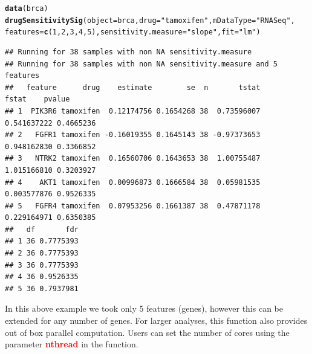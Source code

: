 \documentclass{article}\usepackage[]{graphicx}\usepackage[]{xcolor}
\makeatletter
\newcommand{\hlnum}[1]{\textcolor[rgb]{0.686,0.059,0.569}{#1}}%
\newcommand{\hlstr}[1]{\textcolor[rgb]{0.192,0.494,0.8}{#1}}%
\newcommand{\hlstd}[1]{\textcolor[rgb]{0.345,0.345,0.345}{#1}}%
\newcommand{\hlkwc}[1]{\textcolor[rgb]{0.333,0.667,0.333}{#1}}%
\newcommand{\hlkwd}[1]{\textcolor[rgb]{0.737,0.353,0.396}{\textbf{#1}}}%
\newenvironment{kframe}{%
 \def\at@end@of@kframe{}%
 \ifinner\ifhmode%
  \def\at@end@of@kframe{\end{minipage}}%
  \begin{minipage}{\columnwidth}%
 \fi\fi%
 \def\FrameCommand##1{\hskip\@totalleftmargin \hskip-\fboxsep
 \colorbox{shadecolor}{##1}\hskip-\fboxsep
     \hskip-\linewidth \hskip-\@totalleftmargin \hskip\columnwidth}%
 \MakeFramed {\advance\hsize-\width
   \@totalleftmargin\z@ \linewidth\hsize
   \@setminipage}}%
 {\par\unskip\endMakeFramed%
 \at@end@of@kframe}
\newenvironment{knitrout}{}{} %
\makeatother
\begin{document}
\begin{knitrout}
\color{fgcolor}\begin{kframe}
\begin{alltt}
\hlkwd{data}\hlstd{(brca)}
\hlkwd{drugSensitivitySig}\hlstd{(}\hlkwc{object}\hlstd{=brca,} \hlkwc{drug}\hlstd{=}\hlstr{"tamoxifen"}\hlstd{,} \hlkwc{mDataType}\hlstd{=}\hlstr{"RNASeq"}\hlstd{,}
                   \hlkwc{features}\hlstd{=}\hlkwd{c}\hlstd{(}\hlnum{1}\hlstd{,}\hlnum{2}\hlstd{,}\hlnum{3}\hlstd{,}\hlnum{4}\hlstd{,}\hlnum{5}\hlstd{),} \hlkwc{sensitivity.measure}\hlstd{=}\hlstr{"slope"}\hlstd{,} \hlkwc{fit}\hlstd{=}\hlstr{"lm"}\hlstd{)}
\end{alltt}
\begin{verbatim}
## Running for 38 samples with non NA sensitivity.measure
## Running for 38 samples with non NA sensitivity.measure and 5 features
##   feature      drug    estimate        se  n       tstat       fstat    pvalue
## 1  PIK3R6 tamoxifen  0.12174756 0.1654268 38  0.73596007 0.541637222 0.4665236
## 2   FGFR1 tamoxifen -0.16019355 0.1645143 38 -0.97373653 0.948162830 0.3366852
## 3   NTRK2 tamoxifen  0.16560706 0.1643653 38  1.00755487 1.015166810 0.3203927
## 4    AKT1 tamoxifen  0.00996873 0.1666584 38  0.05981535 0.003577876 0.9526335
## 5   FGFR4 tamoxifen  0.07953256 0.1661387 38  0.47871178 0.229164971 0.6350385
##   df       fdr
## 1 36 0.7775393
## 2 36 0.7775393
## 3 36 0.7775393
## 4 36 0.9526335
## 5 36 0.7937981
\end{verbatim}
\end{kframe}
\end{knitrout}

In this above example we took only 5 features (genes), however this can be
extended for any number of genes. For larger analyses, this function also provides
out of box parallel computation. Users can set the number of cores using the parameter
\textbf{\textcolor{red}{nthread}} in the function.
\end{document}
